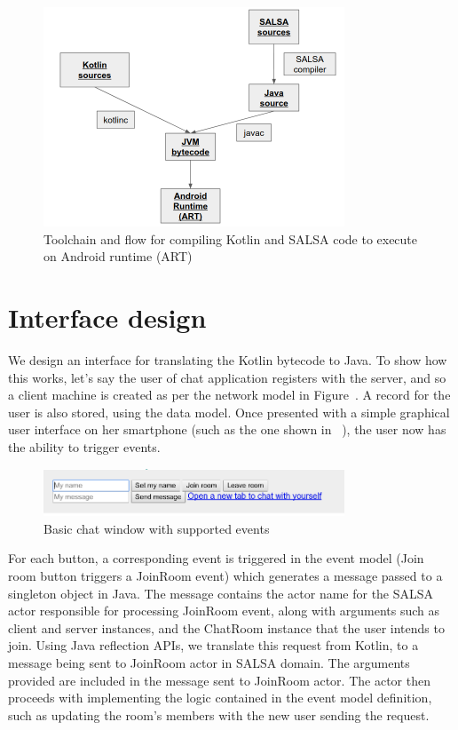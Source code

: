 \documentclass[a4paper]{article}
\begin{document}
\begin{figure}
\centering
\includegraphics[width=0.8\textwidth]{toolchain.png}
\caption{\label{toolchain}Toolchain and flow for compiling Kotlin and SALSA code to execute on Android runtime (ART)}
\end{figure}

\section{Interface design}
We design an interface for translating the Kotlin bytecode to Java. To show how this works, let's say the user of chat application registers with the server, and so a client machine is created as per the network model in Figure~. A record for the user is also stored, using the data model. Once presented with a simple graphical user interface on her smartphone (such as the one shown in ~), the user now has the ability to trigger events. 
\begin{figure}
\centering
\includegraphics[width=0.8\textwidth]{Chat.png}
\caption{\label{fig:chat}Basic chat window with supported events}
\end{figure}

For each button, a corresponding event is triggered in the event model (Join room button triggers a JoinRoom event) which generates a message passed to a singleton object in Java. The message contains the actor name for the SALSA actor responsible for processing JoinRoom event, along with arguments such as client and server instances, and the ChatRoom instance that the user intends to join. Using Java reflection APIs, we translate this request from Kotlin, to a message being sent to JoinRoom actor in  SALSA domain. The arguments provided are included in the message sent to JoinRoom actor. The actor then proceeds with implementing the logic contained in the event model definition, such as updating the room's members with the new user sending the request. 
\end{document}
